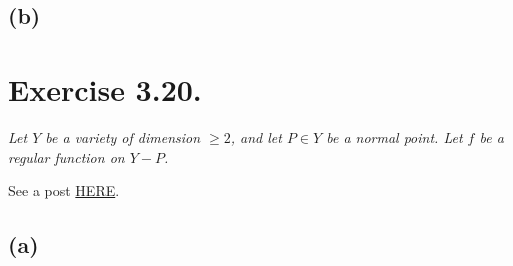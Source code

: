 \subsection{(b)}
\textit{}


\section{Exercise 3.20.}
\textit{Let $Y$ be a variety of dimension $\geq 2$, and let $P\in Y$ be a normal point. Let $f$ be a regular function on $Y-P$.}

See a post \href{https://math.stackexchange.com/questions/1791250/regular-functions-extension-to-normal-points-of-varieties}{HERE}. 

\subsection{(a)}